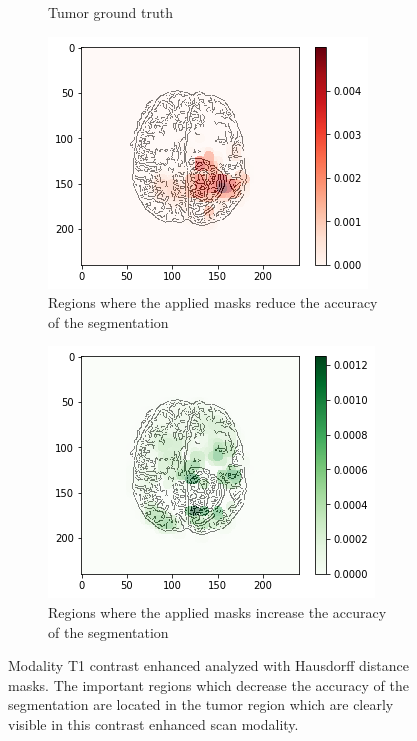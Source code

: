 \begin{figure}[H]
\begin{subfigure}[t]{.4\textwidth}
        \caption{Tumor ground truth}
    \end{subfigure}
    \begin{subfigure}[t]{.45\textwidth}
        \centering
        \includegraphics[width=\linewidth]{chapters/06_hdm/b_Brats18_TCIA08_242_1_L2/28.png}
        \caption{Regions where the applied masks reduce the accuracy of the segmentation}
    \end{subfigure}\hspace{1cm}%
    \begin{subfigure}[t]{.45\textwidth}
        \centering
        \includegraphics[width=\linewidth]{chapters/06_hdm/b_Brats18_TCIA08_242_1_L2/29.png}
        \caption{Regions where the applied masks increase the accuracy of the segmentation}
    \end{subfigure}
    \caption{Modality T1 contrast enhanced analyzed with Hausdorff distance masks. The important regions which decrease the accuracy of the segmentation are located in the tumor region which are clearly visible in this contrast enhanced scan modality.}
\end{figure}

